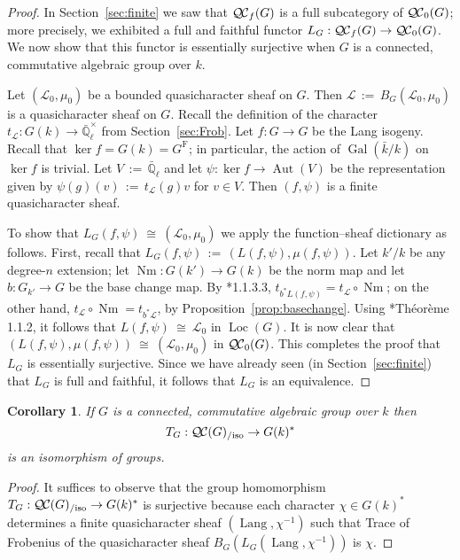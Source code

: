 \documentclass{amsart}
\theoremstyle{plain}
\newtheorem{corollary}[theorem]{Corollary}
\theoremstyle{definition}
\theoremstyle{remark}
\newcommand{\EE}{\mathbb{\bar Q}_\ell}
\newcommand{\bFq}{\bar{k}}
\newcommand{\Fq}{k}
\newcommand{\EEx}{\EE^\times}
\DeclareMathOperator{\Gal}{Gal}
\newcommand{\Frob}[1]{\operatorname{F}_{#1}}
\DeclareMathOperator{\Aut}{Aut}
\DeclareMathOperator{\Nm}{Nm}
\DeclareMathOperator{\Lang}{Lang}
\DeclareMathOperator{\Loc}{Loc}
\newcommand{\ceq}{{\, :=\, }}
\newcommand{\iso}{{\ \cong\ }}
\newcommand{\qcs}[1]{{\mathcal{#1}}}
\newcommand{\QC}{{\mathcal{Q\hskip-0.8pt C}}}
\newcommand{\QCb}{{\QC_0}}
\newcommand{\QCf}{{\QC_f}}
\newcommand{\QCiso}[1]{\QC(#1)_{/\text{iso}}}
\newcommand{\trFrob}[1]{t_{#1}}
\newcommand{\TrFrob}[1]{T_{#1}}
\begin{document}
\begin{proof}
  In Section~\ref{sec:finite} we saw that $\QCf(G)$ is a full subcategory of $\QCb(G)$;
  more precisely, we exhibited a full and faithful functor $L_G : \QCf(G) \to \QCb(G)$.
  We now show that this functor is essentially surjective
  when $G$ is a connected, commutative algebraic group over $\Fq$.

  Let $(\qcs{L}_0,\mu_0)$ be a bounded quasicharacter sheaf on $G$.
  Then $\qcs{L}\ceq B_G(\qcs{L}_0,\mu_0)$ is a quasicharacter sheaf on $G$.
  Recall the definition of the character $\trFrob{\qcs{L}} : G(\Fq) \to \EEx$ from Section~\ref{sec:Frob}.
  Let $f : G\to G$ be the Lang isogeny.
  Recall that $\ker f = G(\Fq) = G^{\Frob{}}$;
  in particular, the action of $\Gal(\bFq/\Fq)$ on $\ker f$ is trivial.
  Let $V \ceq \EE$ and let $\psi : \ker f \to \Aut(V)$ be the representation given by
  $\psi(g)(v) \ceq \trFrob{\qcs{L}}(g) v$ for $v\in V$.
  Then $(f,\psi)$ is a finite quasicharacter sheaf.

  To show that $L_G(f,\psi) \iso (\qcs{L}_0,\mu_0)$ we apply the function--sheaf dictionary
    as follows.
  First, recall that $L_G(f,\psi) \ceq (L(f,\psi), \mu(f,\psi))$.
  Let $k'/k$ be any degree-$n$ extension;
  let $\Nm : G(k')\to G(k)$ be the norm map
  and let $b : G_{k'} \to G$ be the base change map.
  By \cite{laumon:87a}*{1.1.3.3},
  $\trFrob{b^*L(f,\psi)} = \trFrob{\qcs{L}} \circ \Nm$;
  on the other hand, $\trFrob{\qcs{L}} \circ \Nm = \trFrob{b^*\qcs{L}}$,
   by Proposition~\ref{prop:basechange}.
  Using \cite{laumon:87a}*{Th\'eor\`eme 1.1.2}, it follows that  $L(f,\psi) \iso \qcs{L}_0$ in $\Loc(G)$.
  It is now clear that $(L(f,\psi),\mu(f,\psi)) \iso (\qcs{L}_0,\mu_0)$ in $\QCb(G)$.
  This completes the proof that $L_G $ is essentially surjective.
  Since we have already seen (in Section~\ref{sec:finite}) that $L_G$ is full and faithful,
  it follows that $L_G$ is an equivalence.
\end{proof}

\begin{corollary}
 If $G$ is a connected, commutative algebraic group over $\Fq$ then
 \[
  \TrFrob{G} : \QCiso{G} \to G(\Fq)^*
 \]
 is an isomorphism of groups.
\end{corollary}
\begin{proof}
 It suffices to observe that the group homomorphism
 $\TrFrob{G} : \QCiso{G} \to G(\Fq)^*$
 is surjective because each character $\chi \in G(\Fq)^*$ determines a finite quasicharacter
 sheaf $(\Lang,\chi^{-1})$ such that Trace of Frobenius of the quasicharacter sheaf
 $B_G (L_G(\Lang,\chi^{-1}))$ is $\chi$.
\end{proof}
\end{document}
